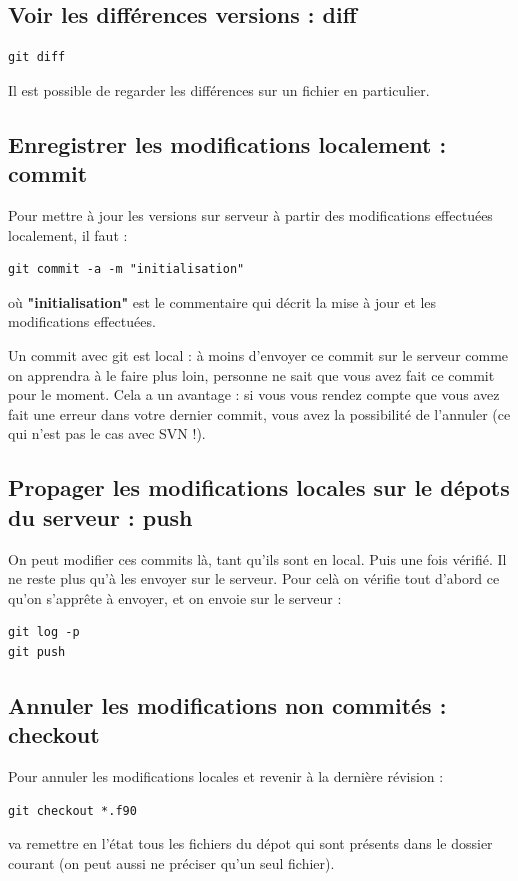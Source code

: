 \documentclass[a4paper,twoside]{article}
\begin{document}
\subsection{Voir les différences versions : diff}

\begin{verbatim}
git diff
\end{verbatim}

\begin{remarque}
Il est possible de regarder les différences sur un fichier en particulier.
\end{remarque}

\subsection{Enregistrer les modifications localement : commit}\label{sec:commit}

Pour mettre à jour les versions sur serveur à partir des modifications effectuées localement, il faut : 
\begin{verbatim}
git commit -a -m "initialisation"
\end{verbatim}
où \textbf{"initialisation"} est le commentaire qui décrit la mise à jour et les modifications effectuées. 

\begin{attention}
Un commit avec git est local : à moins d'envoyer ce commit sur le serveur comme on apprendra à le faire plus loin, personne ne sait que vous avez fait ce commit pour le moment. Cela a un avantage : si vous vous rendez compte que vous avez fait une erreur dans votre dernier commit, vous avez la possibilité de l'annuler (ce qui n'est pas le cas avec SVN !).
\end{attention}

\subsection{Propager les modifications locales sur le dépots du serveur : push}
On peut modifier ces commits là, tant qu'ils sont en local. Puis une fois vérifié. Il ne reste plus qu'à les envoyer sur le serveur. Pour celà on vérifie tout d'abord ce qu'on s'apprête à envoyer, et on envoie sur le serveur : 
\begin{verbatim}
git log -p
git push
\end{verbatim}

\subsection{Annuler les modifications non commités : checkout}
Pour annuler les modifications locales et revenir à la dernière révision : 
\begin{verbatim}
git checkout *.f90
\end{verbatim}
va remettre en l'état tous les fichiers du dépot qui sont présents dans le dossier courant (on peut aussi ne préciser qu'un seul fichier).
\end{document}

